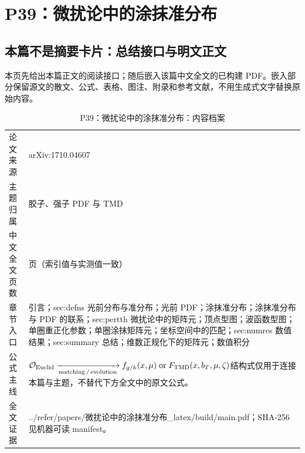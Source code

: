 \documentclass[UTF8,11pt,oneside]{ctexbook}
\begin{document}
\chapter{P39：微扰论中的涂抹准分布}
\section*{本篇不是摘要卡片：总结接口与明文正文}
本页先给出本篇正文的阅读接口；随后嵌入该篇中文全文的已构建 PDF。嵌入部分保留源文的散文、公式、表格、图注、附录和参考文献，不用生成式文字替换原始内容。
\begin{table}[htbp]
  \centering
  \caption{P39：微扰论中的涂抹准分布：内容档案}
  \small
  \begin{tabularx}{0.96\textwidth}{@{}p{3.3cm}>{\raggedright\arraybackslash}X@{}}
    \toprule
    论文来源 & arXiv:1710.04607 \\
    主题归属 & 胶子、强子 PDF 与 TMD \\
    中文全文页数 & 17 页（索引值与实测值一致） \\
    章节入口 & 引言；sec:defns 光前分布与准分布；光前 PDF；涂抹准分布；涂抹准分布与 PDF 的联系；sec:pertth 微扰论中的矩阵元；顶点型图；波函数型图；单圈重正化参数；单圈涂抹矩阵元；坐标空间中的匹配；sec:numres 数值结果；sec:summary 总结；维数正规化下的矩阵元；数值积分 \\
    公式主线 & $\mathcal O_{\rm Euclid}\xrightarrow[\rm matching\,/\,evolution]{}f_{g/h}(x,\mu)\;{\rm or}\;F_{\rm TMD}(x,b_T,\mu,\zeta)$\newline\scriptsize 结构式仅用于连接本篇与主题，不替代下方全文中的原文公式。 \\
    全文证据 & ../\allowbreak{}refer/\allowbreak{}papers/\allowbreak{}微扰论中的涂抹准分布\_\allowbreak{}latex/\allowbreak{}build/\allowbreak{}main.pdf；SHA-256 见机器可读 manifest。 \\
    \bottomrule
  \end{tabularx}
\end{table}
\end{document}
